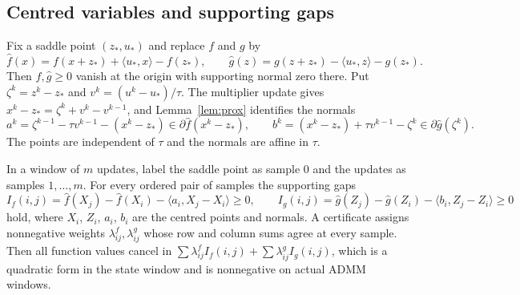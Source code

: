\documentclass[11pt]{article}
\numberwithin{equation}{section}
\theoremstyle{definition}
\theoremstyle{remark}
\newcommand{\ip}[2]{\langle #1,#2\rangle}
\begin{document}
\subsection{Centred variables and supporting gaps}
Fix a saddle point $(z_*,u_*)$ and replace $f$ and $g$ by
\[
\widehat f(x)=f(x+z_*)+\ip{u_*}{x}-f(z_*),\qquad \widehat g(z)=g(z+z_*)-\ip{u_*}{z}-g(z_*).
\]
Then $\widehat f,\widehat g\ge0$ vanish at the origin with supporting normal zero there. Put $\zeta^k=z^k-z_*$ and $v^k=(u^k-u_*)/\tau$. The multiplier update gives $x^k-z_*=\zeta^k+v^k-v^{k-1}$, and Lemma~\ref{lem:prox} identifies the normals
\begin{equation}\label{eq:normals}
a^k=\zeta^{k-1}-\tau v^{k-1}-(x^k-z_*)\in\partial\widehat f(x^k-z_*),\qquad
b^k=(x^k-z_*)+\tau v^{k-1}-\zeta^k\in\partial\widehat g(\zeta^k).
\end{equation}
The points are independent of $\tau$ and the normals are affine in $\tau$.

In a window of $m$ updates, label the saddle point as sample $0$ and the updates as samples $1,\dots,m$. For every ordered pair of samples the supporting gaps
\[
I_f(i,j)=\widehat f(X_j)-\widehat f(X_i)-\ip{a_i}{X_j-X_i}\ge0,\qquad
I_g(i,j)=\widehat g(Z_j)-\widehat g(Z_i)-\ip{b_i}{Z_j-Z_i}\ge0
\]
hold, where $X_i$, $Z_i$, $a_i$, $b_i$ are the centred points and normals. A certificate assigns nonnegative weights $\lambda^f_{ij},\lambda^g_{ij}$ whose row and column sums agree at every sample. Then all function values cancel in $\sum\lambda^f_{ij}I_f(i,j)+\sum\lambda^g_{ij}I_g(i,j)$, which is a quadratic form in the state window and is nonnegative on actual ADMM windows.
\end{document}
